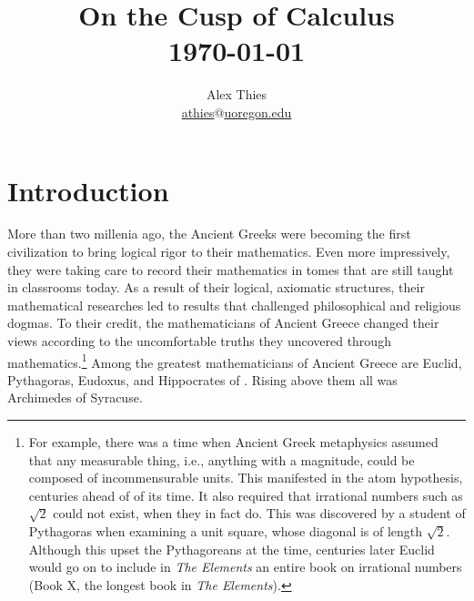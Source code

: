 \documentclass[letterpaper, 12pt]{amsart}
\theoremstyle{definition}  %
\begin{document}
	\title{On the Cusp of Calculus \\ \today}
	\author{Alex Thies \\ \href{mailto:athies@uoregon.edu}{\lowercase{athies$@$uoregon.edu}}}

	\maketitle
	\newpage

	\setcounter{tocdepth}{1}
	\tableofcontents
	\newpage

	\section{Introduction}
	\label{sec:introduction}
	More than two millenia ago, the Ancient Greeks were becoming the first civilization to bring logical rigor to their mathematics.
	Even more impressively, they were taking care to record their mathematics in tomes that are still taught in classrooms today.
	As a result of their logical, axiomatic structures, their mathematical researches led to results that challenged philosophical and religious dogmas.
	To their credit, the mathematicians of Ancient Greece changed their views according to the uncomfortable truths they uncovered through mathematics.\footnote{For example, there was a time when Ancient Greek metaphysics assumed that any measurable thing, i.e., anything with a magnitude, could be composed of incommensurable units. This manifested in the atom hypothesis, centuries ahead of of its time. It also required that irrational numbers such as $\sqrt{2}$ could not exist, when they in fact do. This was discovered by a student of Pythagoras when examining a unit square, whose diagonal is of length $\sqrt{2}$. Although this upset the Pythagoreans at the time, centuries later Euclid would go on to include in \textit{The Elements} an entire book on irrational numbers (Book X, the longest book in \textit{The Elements}).}
	Among the greatest mathematicians of Ancient Greece are Euclid, Pythagoras, Eudoxus, and Hippocrates of .
	Rising above them all was Archimedes of Syracuse.
\end{document}

